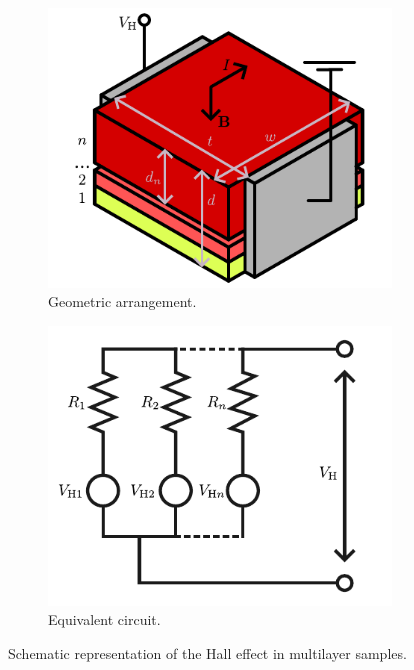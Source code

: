\begin{figure}
	\centering
	\begin{subfigure}{0.45\linewidth}
			\centering
			\includegraphics[width=\linewidth]{../assets/multilayer_hall_1.pdf}
			\caption{Geometric arrangement.}
			\label{fig:multilayer_hall_1}
		\end{subfigure}
		\begin{subfigure}{0.45\linewidth}
			\centering
			\includegraphics[width=\linewidth]{../assets/multilayer_hall_2.pdf}
			\caption{Equivalent circuit.}
			\label{fig:multilayer_hall_2}
		\end{subfigure}
	\caption{Schematic representation of the Hall effect in multilayer samples. 
	}
	\label{fig:multilayer_hall}
\end{figure}

